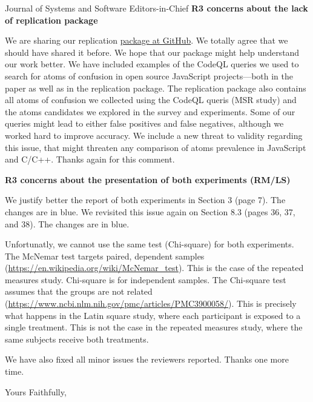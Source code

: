 \documentclass{letter}
\begin{document}
\begin{letter}{Journal of Systems and Software Editors-in-Chief}
{\bf R3 concerns about the lack of replication package}

We are sharing our replication \href{https://github.com/rbonifacio/AtomsJS/tree/main/package}{package at GitHub}.
We totally agree that we should have shared it before. We hope that our package might
help understand our work better. We have included examples of the CodeQL queries we used
to search for atoms of confusion in open source JavaScript projects---both in the paper
as well as in the replication package. The replication package also contains all atoms of
confusion we collected using the CodeQL queris (MSR study) and the atoms candidates
we explored in the survey and experiments. Some of our queries might lead to
either false positives and false negatives, although we worked hard to improve
accuracy. We include a new threat to validity regarding this issue, that might threaten
any comparison of atoms prevalence in JavaScript and C/C++. Thanks again for this comment.

{\bf R3 concerns about the presentation of both experiments (RM/LS)}

We justify better the report of both experiments in Section 3 (page 7). The changes
are in {\color{blue}blue}. We revisited this issue again on Section 8.3 (pages 36, 37, and
38). The changes are in {\color{blue}blue}.

Unfortunatly, we cannot use the same test (Chi-square) for both experiments. The McNemar test targets paired,
dependent samples (\url{https://en.wikipedia.org/wiki/McNemar_test}). This is the case of the repeated measures study.
Chi-square is for independent samples. The Chi-square test assumes that the groups are not related
(\url{https://www.ncbi.nlm.nih.gov/pmc/articles/PMC3900058/}). This is precisely what happens in the Latin square study,
where each participant is exposed to a single treatment. This is not the case in the repeated measures study,
where the same subjects receive both treatments. 


We have also fixed all minor issues the reviewers reported. Thanks one more time.

\closing{Yours Faithfully,}


\end{letter}
\end{document}
